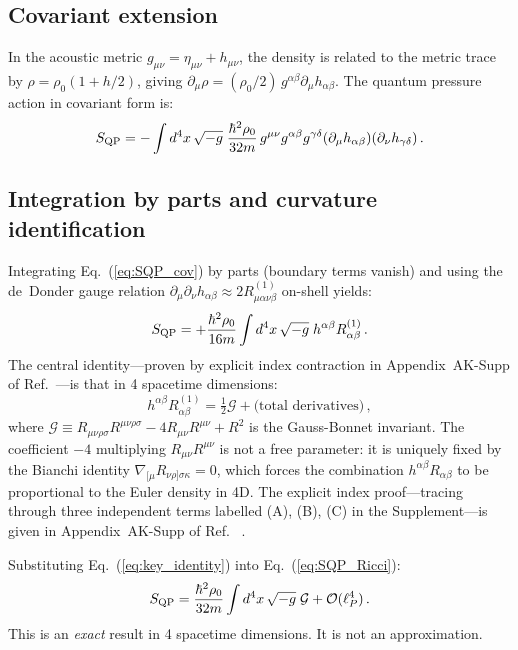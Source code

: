 \documentclass[twocolumn,10pt,a4paper]{article}
\begin{document}
\subsection*{Covariant extension}
In the acoustic metric $g_{\mu\nu} = \eta_{\mu\nu} + h_{\mu\nu}$, the
density is related to the metric trace by $\rho = \rho_0(1 + h/2)$,
giving $\partial_\mu\rho = (\rho_0/2)\,g^{\alpha\beta}\partial_\mu h_{\alpha\beta}$.
The quantum pressure action in covariant form is:
\begin{equation}
  S_{\rm QP} = -\int d^4x\,\sqrt{-g}\;
  \frac{\hbar^2\rho_0}{32m}\,
  g^{\mu\nu}g^{\alpha\beta}g^{\gamma\delta}
  (\partial_\mu h_{\alpha\beta})(\partial_\nu h_{\gamma\delta})\,.
  \label{eq:SQP_cov}
\end{equation}

\subsection*{Integration by parts and curvature identification}
Integrating Eq.~(\ref{eq:SQP_cov}) by parts (boundary terms vanish) and
using the de~Donder gauge relation $\partial_\mu\partial_\nu h_{\alpha\beta}
\approx 2R^{(1)}_{\mu\alpha\nu\beta}$ on-shell yields:
\begin{equation}
  S_{\rm QP} = +\frac{\hbar^2\rho_0}{16m}\int d^4x\,\sqrt{-g}\;
  h^{\alpha\beta} R_{\alpha\beta}^{(1)}\,.
  \label{eq:SQP_Ricci}
\end{equation}
The central identity---proven by explicit index contraction in
Appendix~AK-Supp of Ref.~\cite{monograph}---is that in 4 spacetime
dimensions:
\begin{equation}
  h^{\alpha\beta}R_{\alpha\beta}^{(1)}
  = \tfrac{1}{2}\mathcal{G} + \text{(total derivatives)}\,,
  \label{eq:key_identity}
\end{equation}
where $\mathcal{G} \equiv R_{\mu\nu\rho\sigma}R^{\mu\nu\rho\sigma}
- 4R_{\mu\nu}R^{\mu\nu} + R^2$ is the Gauss-Bonnet invariant. The
coefficient $-4$ multiplying $R_{\mu\nu}R^{\mu\nu}$ is not a free
parameter: it is uniquely fixed by the Bianchi identity
$\nabla_{[\mu}R_{\nu\rho]\sigma\kappa} = 0$, which forces the
combination $h^{\alpha\beta}R_{\alpha\beta}$ to be proportional to
the Euler density in 4D. The explicit index proof---tracing through
three independent terms labelled (A), (B), (C) in the Supplement---is
given in Appendix~AK-Supp of Ref.~\cite{monograph}
\cite{bd75,padmanabhan}.

Substituting Eq.~(\ref{eq:key_identity}) into
Eq.~(\ref{eq:SQP_Ricci}):
\begin{equation}
  S_{\rm QP} = \frac{\hbar^2\rho_0}{32m}
  \int d^4x\,\sqrt{-g}\;\mathcal{G} + \mathcal{O}(\ell_P^4)\,.
  \label{eq:SQP_GB}
\end{equation}
This is an \textit{exact} result in 4 spacetime dimensions. It is not
an approximation.
\end{document}
